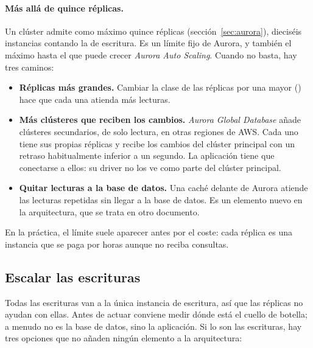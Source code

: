 \documentclass[12pt,a4paper]{article}
\begin{document}
\paragraph{Más allá de quince réplicas.} Un clúster admite como máximo quince réplicas (sección~\ref{sec:aurora}), dieciséis instancias contando la de escritura. Es un límite fijo de Aurora, y también el máximo hasta el que puede crecer \textit{Aurora Auto Scaling}. Cuando no basta, hay tres caminos:

\begin{itemize}
    \item \textbf{Réplicas más grandes.} Cambiar la clase de las réplicas por una mayor (\texttt{}) hace que cada una atienda más lecturas.
    \item \textbf{Más clústeres que reciben los cambios.} \textit{Aurora Global Database} añade clústeres secundarios, de solo lectura, en otras regiones de AWS. Cada uno tiene sus propias réplicas y recibe los cambios del clúster principal con un retraso habitualmente inferior a un segundo. La aplicación tiene que conectarse a ellos: su driver no los ve como parte del clúster principal.
    \item \textbf{Quitar lecturas a la base de datos.} Una caché delante de Aurora atiende las lecturas repetidas sin llegar a la base de datos. Es un elemento nuevo en la arquitectura, que se trata en otro documento.
\end{itemize}

En la práctica, el límite suele aparecer antes por el coste: cada réplica es una instancia que se paga por horas aunque no reciba consultas.

\subsection{Escalar las escrituras}

Todas las escrituras van a la única instancia de escritura, así que las réplicas no ayudan con ellas. Antes de actuar conviene medir dónde está el cuello de botella; a menudo no es la base de datos, sino la aplicación. Si lo son las escrituras, hay tres opciones que no añaden ningún elemento a la arquitectura:
\end{document}
